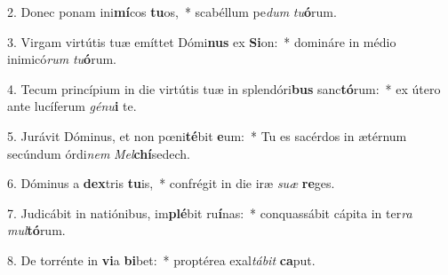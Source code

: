 2. Donec ponam ini\textbf{mí}cos \textbf{tu}os,~*  scabéllum pe\textit{dum} \textit{tu}\textbf{ó}rum.\

3. Virgam virtútis tuæ emíttet Dómi\textbf{nus} ex \textbf{Si}on:~*  domináre in médio inimicó\textit{rum} \textit{tu}\textbf{ó}rum.\

4. Tecum princípium in die virtútis tuæ in splendóri\textbf{bus} sanc\textbf{tó}rum:~*  ex útero ante lucíferum \textit{gé}\textit{nu}\textbf{i} te.\

5. Jurávit Dóminus, et non pœni\textbf{té}bit \textbf{e}um:~*  Tu es sacérdos in ætérnum secúndum órdi\textit{nem} \textit{Mel}\textbf{chí}sedech.\

6. Dóminus a \textbf{dex}tris \textbf{tu}is,~*  confrégit in die iræ \textit{su}\textit{æ} \textbf{re}ges.\

7. Judicábit in natiónibus, im\textbf{plé}bit ru\textbf{í}nas:~*  conquassábit cápita in ter\textit{ra} \textit{mul}\textbf{tó}rum.\

8. De torrénte in \textbf{vi}a \textbf{bi}bet:~*  proptérea exal\textit{tá}\textit{bit} \textbf{ca}put.\

